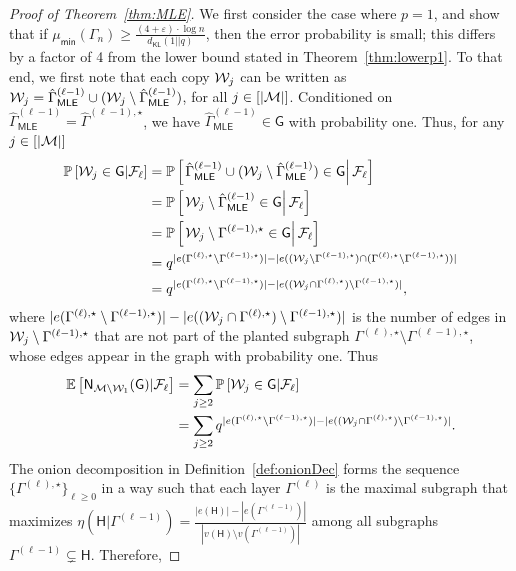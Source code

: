 \documentclass[12pt]{article}
\newcommand{\bE}{\mathbb{E}}
\newcommand {\pr} {\mathbb{P}}
\newcommand{\calF}{{\cal F}}
\newcommand{\calM}{{\cal M}}
\newcommand{\calW}{{\cal W}}
\newcommand{\pp}[1]{\left[#1\right]}
\newcommand{\s}[1]{\mathsf{#1}}
\begin{document}
\begin{proof}[Proof of Theorem~\ref{thm:MLE}]
We first consider the case where $p=1$, and show that if $\mu_{\s{min}}(\Gamma_n)\geq \frac{(4+\varepsilon)\cdot \log n}{d_{\s{KL}}(1||q)}$, then the error probability is small; this differs by a factor of 4 from the lower bound stated in Theorem~\ref{thm:lowerp1}. To that end, we first note that each copy $\calW_j$ can be written as $\calW_j = \hat{\Gamma}^{(\ell-1)}_{\s{MLE}}\cup(\calW_j\setminus\hat{\Gamma}^{(\ell-1)}_{\s{MLE}})$, for all $j\in[|\calM|]$. Conditioned on $\hat{\Gamma}^{(\ell-1)}_{\s{MLE}}=\hat{\Gamma}^{(\ell-1),\star}$, we have $\hat{\Gamma}^{(\ell-1)}_{\s{MLE}}\in\s{G}$ with probability one. Thus, for any $j\in[|\calM|]$
\begin{align}
\pr\pp{\calW_j\in\s{G}\vert\calF_\ell} &= \pr\pp{\left.\hat{\Gamma}^{(\ell-1)}_{\s{MLE}}\cup(\calW_j\setminus\hat{\Gamma}^{(\ell-1)}_{\s{MLE}})\in\s{G}\right|\calF_\ell}\\
& = \pr\pp{\left.\calW_j\setminus\hat{\Gamma}^{(\ell-1)}_{\s{MLE}}\in\s{G}\right|\calF_\ell}\\
& = \pr\pp{\left.\calW_j\setminus\Gamma^{(\ell-1),\star}\in\s{G}\right|\calF_\ell}\\
&=q^{|e(\Gamma^{(\ell),\star} \setminus \Gamma^{(\ell-1),\star})|-|e((\calW_j\setminus\Gamma^{(\ell-1),\star})\cap(\Gamma^{(\ell),\star}\setminus\Gamma^{(\ell-1),\star}))|}\\
& = q^{|e(\Gamma^{(\ell),\star} \setminus \Gamma^{(\ell-1),\star})|-|e((\calW_j\cap\Gamma^{(\ell),\star})\setminus\Gamma^{(\ell-1),\star})|},
\end{align}
where $|e(\Gamma^{(\ell),\star} \setminus \Gamma^{(\ell-1),\star})|-|e((\calW_j\cap\Gamma^{(\ell),\star})\setminus\Gamma^{(\ell-1),\star})|$ is the number of edges in $\calW_j\setminus\Gamma^{(\ell-1),\star}$ that are not part of the planted subgraph $\Gamma^{(\ell),\star} \setminus \Gamma^{(\ell-1),\star}$, whose edges appear in the graph with probability one. Thus
\begin{align}
    \bE\pp{\s{N}_{\calM\setminus\calW_1}(\s{G})\vert\calF_\ell} &= \sum_{j\geq2}\pr\pp{\calW_j\in\s{G}\vert\calF_\ell}\\
    & = \sum_{j\geq2}q^{|e(\Gamma^{(\ell),\star} \setminus \Gamma^{(\ell-1),\star})|-|e((\calW_j\cap\Gamma^{(\ell),\star})\setminus\Gamma^{(\ell-1),\star})|}.\label{eqn:momentGenInt0}
\end{align}
The onion decomposition in Definition~\ref{def:onionDec} forms the sequence $\{\Gamma^{(\ell),\star}\}_{\ell\geq0}$ in a way such that each layer $\Gamma^{(\ell)}$ is the maximal subgraph that maximizes $\eta(\s{H} \vert \Gamma^{(\ell-1)}) = \frac{|e(\s{H})|-|e(\Gamma^{(\ell-1)})|}{|v(\s{H})\setminus v(\Gamma^{(\ell-1)})|}$ among all subgraphs $\Gamma^{(\ell-1)}\subsetneq \s{H}$. Therefore,

\end{proof}
\end{document}
